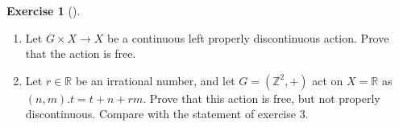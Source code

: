 \documentclass[reqno]{amsart}
\theoremstyle{definition}
\newtheorem{exercise}[theorem]{Exercise}
\theoremstyle{remark}
\begin{document}
    \begin{exercise}[]
        \begin{enumerate}
            \item Let $G \times X \to X$ be a continuous left
                properly discontinuous action. Prove
                that the action is free.
            \item Let $r \in \mathbb{R}$ be an irrational number,
                and let $G = \left( \mathbb{Z}^2, + \right) $ 
                act on $X = \mathbb{R}$ as 
                $\left( n,m \right) . t = t+ n + rm$. Prove
                that this action is free, but not
                properly discontinuous. Compare with the
                statement of exercise 3.
        \end{enumerate}
    \end{exercise}
\end{document}

